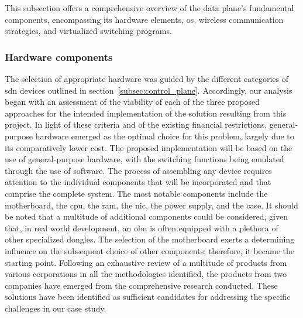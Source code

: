 This subsection offers a comprehensive overview of the data plane's fundamental components, encompassing its hardware elements, \gls{os}, wireless communication strategies, and virtualized switching programs.

\subsubsection{Hardware components}
The selection of appropriate hardware was guided by the different categories of \gls{sdn} devices outlined in section~\ref{subsec:control_plane}. Accordingly, our analysis began with an assessment of the viability of each of the three proposed approaches for the intended implementation of the solution resulting from this project. In light of these criteria and of the existing financial restrictions, general-purpose hardware emerged as the optimal choice for this problem, largely due to its comparatively lower cost. The proposed implementation will be based on the use of general-purpose hardware, with the switching functions being emulated through the use of software.
The process of assembling any device requires attention to the individual components that will be incorporated and that comprise the complete system. The most notable components include the motherboard, the \gls{cpu}, the \gls{ram}, the \gls{nic}, the power supply, and the case. It should be noted that a multitude of additional components could be considered, given that, in real world development, an \gls{obu} is often equipped with a plethora of other specialized dongles.
The selection of the motherboard exerts a determining influence on the subsequent choice of other components; therefore, it became the starting point. Following an exhaustive review of a multitude of products from various corporations in all the methodologies identified, the products from two companies have emerged from the comprehensive research conducted. These solutions have been identified as sufficient candidates for addressing the specific challenges in our case study.
